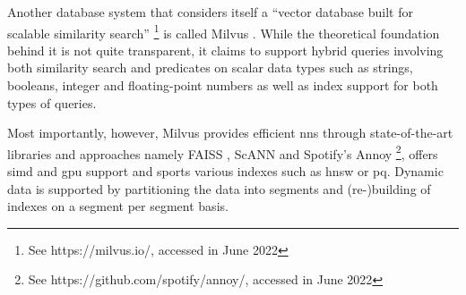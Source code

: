 Another database system that considers itself a ``vector database built for scalable similarity search'' \footnote{See https://milvus.io/, accessed in June 2022} is called Milvus \cite{Wang:2021Milvus}. While the theoretical foundation behind it is not quite transparent, it claims to support hybrid queries involving both similarity search and predicates on scalar data types such as strings, booleans, integer and floating-point numbers as well as index support for both types of queries.

Most importantly, however, Milvus provides efficient \acrshort{nns} through state-of-the-art libraries and approaches namely FAISS \cite{Johnson:2019Billion}, ScANN \cite{Guo:2020Accelerating} and Spotify's Annoy \footnote{See https://github.com/spotify/annoy/, accessed in June 2022}, offers \acrshort{simd} and \acrshort{gpu} support and sports various indexes such as \acrshort{hnsw} or \acrshort{pq}. Dynamic data is supported by partitioning the data into segments and (re-)building of indexes on a segment per segment basis.